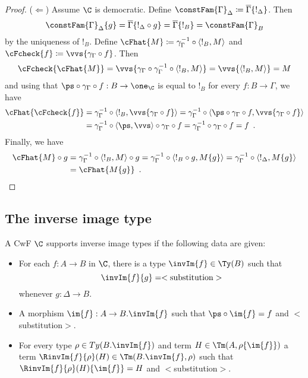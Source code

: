 \documentclass{article}
\begin{document}
\begin{proof}
  ($\Leftarrow$) Assume $\C$ is democratic. Define
  $\constFam{\Gamma}_{\Delta} \coloneqq
  \overline{\Gamma}\{!_{\Delta}\}$. Then
  \[\constFam{\Gamma}_{\Delta}\{g\} = \overline{\Gamma}\{!_{\Delta}
  \circ g\} = \overline{\Gamma}\{!_{B}\} = \constFam{\Gamma}_{B}\] by
  the uniqueness of $!_{B}$. Define $\cFhat{M} \coloneqq
  \gamma_{\Gamma}^{-1} \circ \langle !_{B}, M\rangle$ and $\cFcheck{f}
  \coloneqq \vvs\{\gamma_{\Gamma} \circ f\}$. Then
  \begin{align*}
    \cFcheck{\cFhat{M}}
  = \vvs\{\gamma_{\Gamma} \circ \gamma_{\Gamma}^{-1} \circ \langle !_{B}, M\rangle\}
  = \vvs\{\langle !_{B}, M\rangle\}
  = M
  \end{align*}
  and using that $\ps \circ \gamma_{\Gamma} \circ f : B \to \one_{\C}$
  is equal to $!_{B}$ for every $f : B \to \Gamma$, we have
  \begin{align*}
    \cFhat{\cFcheck{f}}
  &= \gamma_{\Gamma}^{-1} \circ \langle !_{B}, \vvs\{\gamma_{\Gamma} \circ f\}\rangle
   = \gamma_{\Gamma}^{-1} \circ \langle \ps \circ \gamma_{\Gamma} \circ f, \vvs\{\gamma_{\Gamma} \circ f\}\rangle \\
  &= \gamma_{\Gamma}^{-1} \circ \langle \ps, \vvs\rangle \circ \gamma_{\Gamma} \circ f 
   = \gamma_{\Gamma}^{-1} \circ \gamma_{\Gamma} \circ f 
   = f \enspace .
  \end{align*}
Finally, we have
\begin{align*}
    \cFhat{M} \circ g
  &= \gamma_{\Gamma}^{-1} \circ \langle !_{B}, M\rangle \circ g
   = \gamma_{\Gamma}^{-1} \circ \langle !_{B} \circ g, M\{g\}\rangle  
   = \gamma_{\Gamma}^{-1} \circ \langle !_{\Delta}, M\{g\}\rangle \\
  &= \cFhat{M\{g\}} \enspace .
\end{align*}

\end{proof}


\subsection{The inverse image type}

\begin{definition}
  A CwF $\C$ supports inverse image types if the following data are given:
  \begin{itemize}
  \item For each $f : A \to B$ in $\C$, there is a type $\invIm{f} \in
    \Ty(B)$ such that
    \[
    \invIm{f}\{g\} = <\text{substitution}>
    \]
    whenever $g : \Delta \to B$.
  \item A morphism $\im{f} : A \to B.\invIm{f}$ such that $\ps \circ
    \im{f} = f$ and $<$substitution$>$.
  \item For every type $\rho \in Ty(B.\invIm{f})$ and term $H \in
    \Tm(A, \rho\{\im{f}\})$ a term $\RinvIm{f}{\rho}(H) \in
    \Tm(B.\invIm{f}, \rho)$ such that $\RinvIm{f}{\rho}(H)\{\im{f}\} = H$ and
    $<$substitution$>$.
  \end{itemize}
\end{definition}
\end{document}

